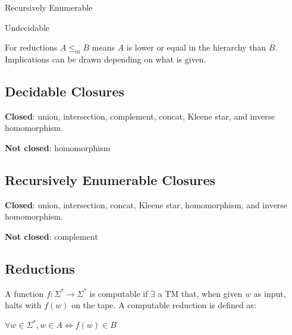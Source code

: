 \hspace{20mm}Recursively Enumerable

\hspace{25mm}Undecidable

For reductions $A \leq_m B$ means $A$ is lower or equal in the hierarchy
than $B$. Implications can be drawn depending on what is given.

\subsection{Decidable Closures}
\textbf{Closed}: union, intersection, complement, concat, Kleene star,
and inverse homomorphism.

\textbf{Not closed}: homomorphism
\subsection{Recursively Enumerable Closures}
\textbf{Closed}: union, intersection, concat, Kleene star, homomorphism,
and inverse homomorphism.

\textbf{Not closed}: complement

\subsection{Reductions}
A function $f: \Sigma^\ast \to \Sigma^\ast$ is computable if $\exists$ a
TM that, when given $w$ as input, halts with $f(w)$ on the tape. A
computable reduction is defined as:

$\forall w \in \Sigma^\ast, w\in A \iff f(w)\in B$